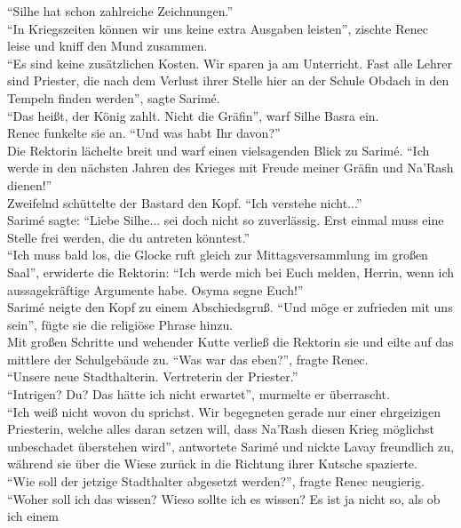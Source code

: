 ``Silhe hat schon zahlreiche Zeichnungen.''\\
``In Kriegszeiten können wir uns keine extra Ausgaben leisten'', zischte Renec leise und kniff den 
Mund zusammen.\\
``Es sind keine zusätzlichen Kosten. Wir sparen ja am Unterricht. Fast alle Lehrer sind Priester, 
die nach dem Verlust ihrer Stelle hier an der Schule Obdach in den Tempeln finden werden'', sagte 
Sarimé.\\
``Das heißt, der König zahlt. Nicht die Gräfin'', warf Silhe Basra ein.\\
Renec funkelte sie an. ``Und was habt Ihr davon?''\\
Die Rektorin lächelte breit und warf einen vielsagenden Blick zu Sarimé. ``Ich werde in den 
nächsten Jahren des Krieges mit Freude meiner Gräfin und Na'Rash dienen!''\\
Zweifelnd schüttelte der Bastard den Kopf. ``Ich verstehe nicht...''\\
Sarimé sagte: ``Liebe Silhe... sei doch nicht so zuverlässig. Erst einmal muss eine Stelle frei 
werden, die du antreten könntest.''\\
``Ich muss bald los, die Glocke ruft gleich zur Mittagsversammlung im großen Saal'', erwiderte die 
Rektorin: ``Ich werde mich bei Euch melden, Herrin, wenn ich aussagekräftige Argumente habe. Osyma 
segne Euch!''\\
Sarimé neigte den Kopf zu einem Abschiedsgruß. ``Und möge er zufrieden mit uns sein'', fügte sie 
die religiöse Phrase hinzu.\\
Mit großen Schritte und wehender Kutte verließ die Rektorin sie und eilte auf das mittlere der 
Schulgebäude zu. ``Was war das eben?'', fragte Renec.\\
``Unsere neue Stadthalterin. Vertreterin der Priester.''\\
``Intrigen? Du? Das hätte ich nicht erwartet'', murmelte er überrascht.\\
``Ich weiß nicht wovon du sprichst. Wir begegneten gerade nur einer ehrgeizigen Priesterin, welche 
alles daran setzen will, dass Na'Rash diesen Krieg möglichst unbeschadet überstehen wird'', 
antwortete Sarimé und nickte Lavay freundlich zu, während sie über die Wiese zurück in die Richtung 
ihrer Kutsche spazierte.\\
``Wie soll der jetzige Stadthalter abgesetzt werden?'', fragte Renec neugierig.\\
``Woher soll ich das wissen? Wieso sollte ich es wissen? Es ist ja nicht so, als ob ich einem 

